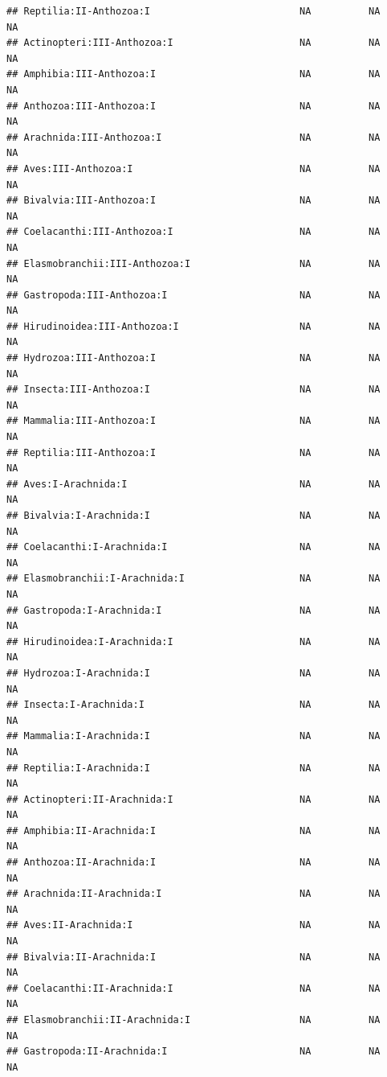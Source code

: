 \documentclass[
  12pt,
]{article}
\begin{document}
\begin{verbatim}
## Reptilia:II-Anthozoa:I                          NA          NA          NA
## Actinopteri:III-Anthozoa:I                      NA          NA          NA
## Amphibia:III-Anthozoa:I                         NA          NA          NA
## Anthozoa:III-Anthozoa:I                         NA          NA          NA
## Arachnida:III-Anthozoa:I                        NA          NA          NA
## Aves:III-Anthozoa:I                             NA          NA          NA
## Bivalvia:III-Anthozoa:I                         NA          NA          NA
## Coelacanthi:III-Anthozoa:I                      NA          NA          NA
## Elasmobranchii:III-Anthozoa:I                   NA          NA          NA
## Gastropoda:III-Anthozoa:I                       NA          NA          NA
## Hirudinoidea:III-Anthozoa:I                     NA          NA          NA
## Hydrozoa:III-Anthozoa:I                         NA          NA          NA
## Insecta:III-Anthozoa:I                          NA          NA          NA
## Mammalia:III-Anthozoa:I                         NA          NA          NA
## Reptilia:III-Anthozoa:I                         NA          NA          NA
## Aves:I-Arachnida:I                              NA          NA          NA
## Bivalvia:I-Arachnida:I                          NA          NA          NA
## Coelacanthi:I-Arachnida:I                       NA          NA          NA
## Elasmobranchii:I-Arachnida:I                    NA          NA          NA
## Gastropoda:I-Arachnida:I                        NA          NA          NA
## Hirudinoidea:I-Arachnida:I                      NA          NA          NA
## Hydrozoa:I-Arachnida:I                          NA          NA          NA
## Insecta:I-Arachnida:I                           NA          NA          NA
## Mammalia:I-Arachnida:I                          NA          NA          NA
## Reptilia:I-Arachnida:I                          NA          NA          NA
## Actinopteri:II-Arachnida:I                      NA          NA          NA
## Amphibia:II-Arachnida:I                         NA          NA          NA
## Anthozoa:II-Arachnida:I                         NA          NA          NA
## Arachnida:II-Arachnida:I                        NA          NA          NA
## Aves:II-Arachnida:I                             NA          NA          NA
## Bivalvia:II-Arachnida:I                         NA          NA          NA
## Coelacanthi:II-Arachnida:I                      NA          NA          NA
## Elasmobranchii:II-Arachnida:I                   NA          NA          NA
## Gastropoda:II-Arachnida:I                       NA          NA          NA

\end{verbatim}
\end{document}
